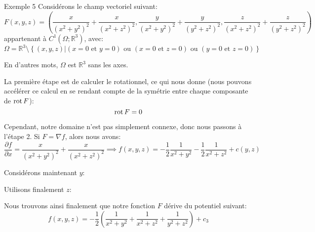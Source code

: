 \documentclass[a4paper]{article}
\begin{document}
\begin{parag}{Exemple 5}
    Considérons le champ vectoriel suivant: 
    \[F\left(x, y, z\right) = \left(\frac{x}{\left(x^2 + y^2\right)^2} + \frac{x}{\left(x^2 + z^2\right)^2}, \frac{y}{\left(x^2 + y^2\right)^2} + \frac{y}{\left(y^2 + z^2\right)^2}, \frac{z}{\left(x^2 + z^2\right)^2} + \frac{z}{\left(y^2 + z^2\right)^2}\right)\]
    appartenant à $C^1\left(\Omega; \mathbb{R}^3\right)$, avec:
    \[\Omega = \mathbb{R}^3 \setminus \left\{\left(x, y, z\right) | \left(x = 0 \text{ et } y = 0\right) \text{ ou } \left(x = 0 \text{ et } z = 0\right) \text{ ou } \left(y = 0 \text{ et } z = 0\right)\right\}\]

    En d'autres mots, $\Omega$ est $\mathbb{R}^3$ sans les axes.

    La première étape est de calculer le rotationnel, ce qui nous donne (nous pouvons accélérer ce calcul en se rendant compte de la symétrie entre chaque composante de $\operatorname{rot} F$): 
    \[\operatorname{rot} F = 0\]
    
    Cependant, notre domaine n'est pas simplement connexe, donc nous passons à l'étape 2. Si $F = \nabla f$, alors nous avons: 
    \[\frac{\partial f}{\partial x} = \frac{x}{\left(x^2 + y^2\right)^2} + \frac{x}{\left(x^2 + z^2\right)^2} \implies f\left(x, y, z\right) = -\frac{1}{2} \frac{1}{x^2 + y^2} - \frac{1}{2} \frac{1}{x^2 + z^2} + c\left(y, z\right)\]
    
    Considérons maintenant $y$: 
    
    Utilisons finalement $z$: 
    
    Nous trouvons ainsi finalement que notre fonction $F$ dérive du potentiel suivant: 
    \[f\left(x, y, z\right) = -\frac{1}{2}\left(\frac{1}{x^2 + y^2} + \frac{1}{x^2 + z^2} + \frac{1}{y^2 + z^2}\right) + c_3\]
\end{parag}
\end{document}
